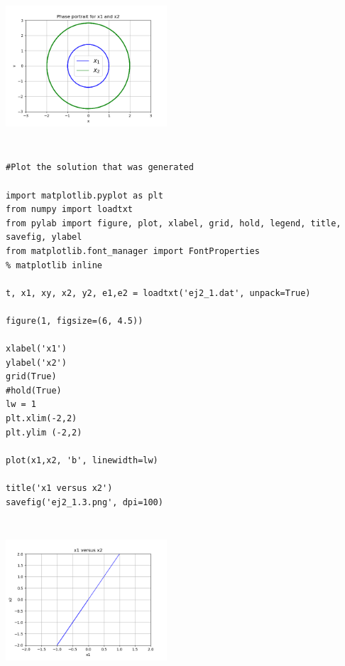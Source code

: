\documentclass{article}
\begin{document}
\begin{center}
  \includegraphics[width=6cm, height=6cm]{ej2_12.png}
\end{center}

\begin{verbatim}
#Plot the solution that was generated

import matplotlib.pyplot as plt
from numpy import loadtxt
from pylab import figure, plot, xlabel, grid, hold, legend, title, savefig, ylabel
from matplotlib.font_manager import FontProperties
% matplotlib inline

t, x1, xy, x2, y2, e1,e2 = loadtxt('ej2_1.dat', unpack=True)

figure(1, figsize=(6, 4.5))

xlabel('x1')
ylabel('x2')
grid(True)
#hold(True)
lw = 1
plt.xlim(-2,2)
plt.ylim (-2,2)

plot(x1,x2, 'b', linewidth=lw)
                                    
title('x1 versus x2')
savefig('ej2_1.3.png', dpi=100)

\end{verbatim}

\begin{center}
  \includegraphics[width=6cm, height=6cm]{ej2_13.png}
\end{center}
\end{document}

